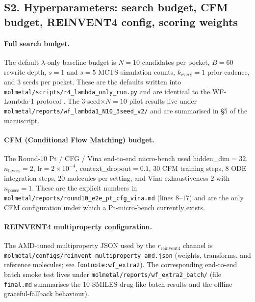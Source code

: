 
\subsection*{S2. Hyperparameters: search budget, CFM budget, REINVENT4 config, scoring weights}
\label{supp:s2-hparams}

\paragraph{Full search budget.}
The default $\lambda$-only baseline budget is $N{=}10$ candidates per
pocket, $B{=}60$ rewrite depth, $s{=}1$ and $s{=}5$ MCTS simulation
counts, $k_{\text{every}}{=}1$ prior cadence, and 3 seeds per pocket.
These are the defaults written into
\texttt{molmetal/scripts/r4\_lambda\_only\_run.py} and are identical to
the WF-Lambda-1 protocol \cite{footnote:wf_lambda1}.  The
3-seed$\times$$N{=}10$ pilot results live under
\texttt{molmetal/reports/wf\_lambda1\_N10\_3seed\_v2/} and are summarised
in \S5 of the manuscript.

\paragraph{CFM (Conditional Flow Matching) budget.}
The Round-10 Pt / CFG / Vina end-to-end micro-bench \cite{footnote:round10_e2e}
used hidden\_dim$=32$, $n_{\text{layers}}{=}2$, lr$=2{\times}10^{-4}$,
context\_dropout$=0.1$, $30$ CFM training steps, $8$ ODE integration
steps, $20$ molecules per setting, and Vina exhaustiveness $2$ with
$n_{\text{poses}}{=}1$.  These are the explicit numbers in
\texttt{molmetal/reports/round10\_e2e\_pt\_cfg\_vina.md} (lines
8--17) and are the only CFM configuration under which a \MEASURED{}
Pt-micro-bench currently exists.

\paragraph{REINVENT4 multiproperty configuration.}
The AMD-tuned multiproperty JSON used by the $r_{\text{reinvent4}}$
channel is \texttt{molmetal/configs/reinvent\_multiproperty\_amd.json}
(weights, transforms, and reference molecules; see
\texttt{footnote:wf\_extra2}).  The corresponding end-to-end batch
smoke test lives under
\texttt{molmetal/reports/wf\_extra2\_batch/} (file
\texttt{final.md} summarises the 10-SMILES drug-like batch results and
the offline graceful-fallback behaviour).

